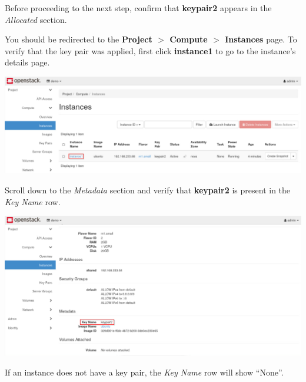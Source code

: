 \documentclass[letterpaper, 12pt]{article}
\begin{document}
\begin{enumerate}
    \begin{stopbox}
        Before proceeding to the next step, confirm that \textbf{keypair2} appears in the \textit{Allocated} section.
    \end{stopbox}

    \begin{labstep}
        You should be redirected to the \textbf{Project $>$ Compute $>$ Instances} page.
        To verify that the key pair was applied, first click \textbf{instance1} to go to the instance's details page.

        \begin{center}
            \includegraphics[width=\linewidth]{images/part8/step12.png}
        \end{center}
    \end{labstep}

    \begin{labstep}
        Scroll down to the \textit{Metadata} section and verify that \textbf{keypair2} is present in the \textit{Key Name} row.

        \begin{center}
            \includegraphics[width=\linewidth]{images/part8/step13.png}
        \end{center}
    \end{labstep}

    \begin{notebox}
        If an instance does not have a key pair, the \textit{Key Name} row will show ``None''.
    \end{notebox}


\end{enumerate}
\end{document}
